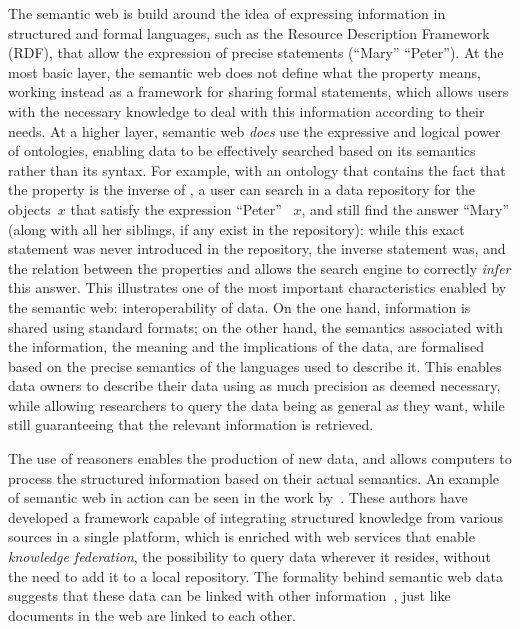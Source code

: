 The semantic web is build around the idea of expressing information in structured and formal languages, such as the Resource Description Framework (RDF), that allow the expression of precise statements (\eg ``Mary''  ``Peter''). At the most basic layer, the semantic web does not define what the property  means, working instead as a framework for sharing formal statements, which allows users with the necessary knowledge to deal with this information according to their needs. At a higher layer, semantic web \emph{does} use the expressive and logical power of ontologies, enabling data to be effectively searched based on its semantics rather than its syntax. For example, with an ontology that contains the fact that the property  is the inverse of , a user can search in a data repository for the objects~$x$ that satisfy the expression ``Peter'' ~$x$, and still find the answer ``Mary'' (along with all her siblings, if any exist in the repository): while this exact statement was never introduced in the repository, the inverse statement was, and the relation between the properties  and  allows the search engine to correctly \emph{infer} this answer. This illustrates one of the most important characteristics enabled by the semantic web: interoperability of data. On the one hand, information is shared using standard formats; on the other hand, the semantics associated with the information, \ie the meaning and the implications of the data, are formalised based on the precise semantics of the languages used to describe it. This enables data owners to describe their data using as much precision as deemed necessary, while allowing researchers to query the data being as general as they want, while still guaranteeing that the relevant information is retrieved.

The use of reasoners enables the production of new data, and allows computers to process the structured information based on their actual semantics. An example of semantic web in action can be seen in the work by~\citet{Lopes2012}. These authors have developed a framework capable of integrating structured knowledge from various sources in a single platform, which is enriched with web services that enable \emph{knowledge federation}, \ie the possibility to query data wherever it resides, without the need to add it to a local repository. The formality behind semantic web data suggests that these data can be linked with other information~\citep{Bizer2009, Bizer2009a}, just like documents in the web are linked to each other.

